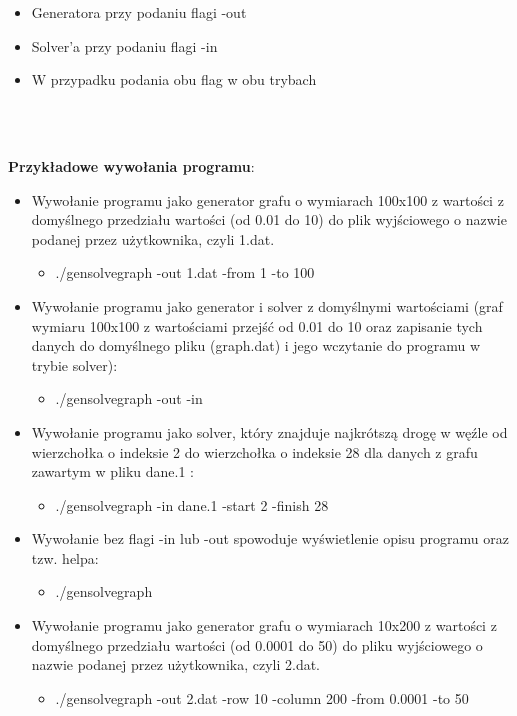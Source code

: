 \documentclass[polish, 12pt, a4paper]{article}
\begin{document}
\begin{itemize}
    \item Generatora przy podaniu flagi -out
    \item Solver'a przy podaniu flagi -in
    \item W przypadku podania obu flag w obu trybach
\end{itemize}
\\
\\
\begin{large}
    \textbf{Przykładowe wywołania programu}:
\end{large}
\begin{itemize}
    \item Wywołanie programu jako generator grafu o wymiarach 100x100 z wartości z domyślnego przedziału wartości (od 0.01 do 10) do plik wyjściowego o nazwie podanej przez użytkownika, czyli 1.dat.
    \begin{itemize}
        \item ./gensolvegraph -out 1.dat -from 1 -to 100
    \end{itemize}
    \item Wywołanie programu jako generator i solver z domyślnymi wartościami (graf wymiaru 100x100 z wartościami przejść od 0.01 do 10 oraz zapisanie tych danych do domyślnego pliku (graph.dat) i jego wczytanie do programu w trybie solver):
    \begin{itemize}
        \item ./gensolvegraph -out -in 
    \end{itemize}
    \item Wywołanie programu jako solver, który znajduje najkrótszą drogę w węźle od wierzchołka o indeksie 2 do wierzchołka o indeksie 28 dla danych z grafu zawartym w pliku dane.1 :
     \begin{itemize}
        \item ./gensolvegraph -in dane.1 -start 2 -finish 28
    \end {itemize}
    \item Wywołanie bez flagi -in lub -out spowoduje wyświetlenie opisu programu oraz tzw. helpa:
    \begin{itemize} 
        \item ./gensolvegraph
    \end{itemize}
    \item Wywołanie programu jako generator grafu o wymiarach 10x200 z wartości z domyślnego przedziału wartości (od 0.0001 do 50) do pliku wyjściowego o nazwie podanej przez użytkownika, czyli 2.dat.
    \begin{itemize}
        \item ./gensolvegraph -out 2.dat -row 10 -column 200 -from 0.0001 -to 50
    \end{itemize}
\end{itemize}
\end{document}
